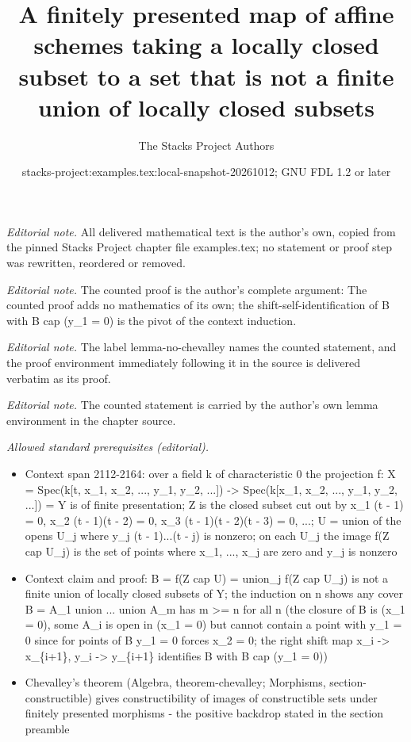 \documentclass[10pt,a4paper]{amsart}
\title{A finitely presented map of affine schemes taking a locally closed subset to a set that is not a finite union of locally closed subsets}
\author{The Stacks Project Authors}
\date{stacks-project:examples.tex:local-snapshot-20261012; GNU FDL 1.2 or later}
\theoremstyle{plain}
\theoremstyle{definition}
\theoremstyle{remark}
\numberwithin{equation}{subsection}
\begin{document}
\maketitle
\noindent\textit{Editorial note.} All delivered mathematical text is the author's own, copied from the pinned Stacks Project chapter file examples.tex; no statement or proof step was rewritten, reordered or removed.\par\medskip
\noindent\textit{Editorial note.} The counted proof is the author's complete argument: The counted proof adds no mathematics of its own; the shift-self-identification of B with B cap (y\_1 = 0) is the pivot of the context induction.\par\medskip
\noindent\textit{Editorial note.} The label lemma-no-chevalley names the counted statement, and the proof environment immediately following it in the source is delivered verbatim as its proof.\par\medskip
\noindent\textit{Editorial note.} The counted statement is carried by the author's own lemma environment in the chapter source.\par\medskip
\noindent\textit{Allowed standard prerequisites (editorial).}\begin{itemize}
\item Context span 2112-2164: over a field k of characteristic 0 the projection f: X = Spec(k[t, x\_1, x\_2, ..., y\_1, y\_2, ...]) -> Spec(k[x\_1, x\_2, ..., y\_1, y\_2, ...]) = Y is of finite presentation; Z is the closed subset cut out by x\_1 (t - 1) = 0, x\_2 (t - 1)(t - 2) = 0, x\_3 (t - 1)(t - 2)(t - 3) = 0, ...; U = union of the opens U\_j where y\_j (t - 1)...(t - j) is nonzero; on each U\_j the image f(Z cap U\_j) is the set of points where x\_1, ..., x\_j are zero and y\_j is nonzero
\item Context claim and proof: B = f(Z cap U) = union\_j f(Z cap U\_j) is not a finite union of locally closed subsets of Y; the induction on n shows any cover B = A\_1 union ... union A\_m has m >= n for all n (the closure of B is (x\_1 = 0), some A\_i is open in (x\_1 = 0) but cannot contain a point with y\_1 = 0 since for points of B y\_1 = 0 forces x\_2 = 0; the right shift map x\_i -> x\_\{i+1\}, y\_i -> y\_\{i+1\} identifies B with B cap (y\_1 = 0))
\item Chevalley's theorem (Algebra, theorem-chevalley; Morphisms, section-constructible) gives constructibility of images of constructible sets under finitely presented morphisms - the positive backdrop stated in the section preamble
\end{itemize}\medskip
\end{document}
